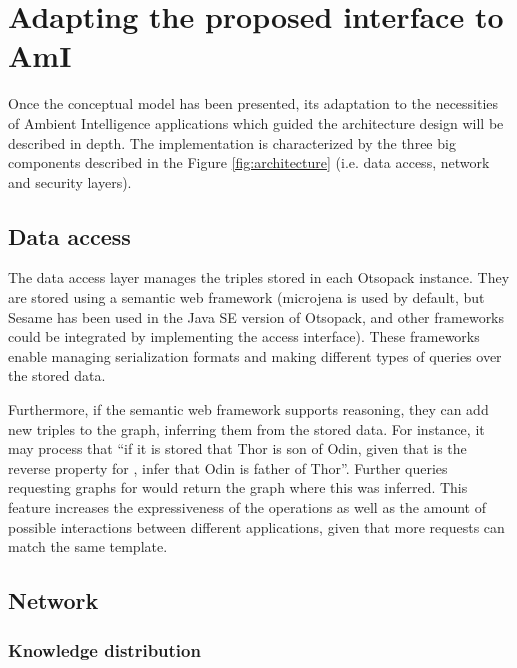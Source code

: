 
\section{Adapting the proposed interface to AmI}

Once the conceptual model has been presented, its adaptation to the necessities of Ambient Intelligence applications
which guided the architecture design will be described in depth. The implementation is characterized by the three big
components described in the Figure \ref{fig:architecture} (i.e. data access, network and security layers).


\subsection{Data access}

The data access layer manages the triples stored in each Otsopack instance. They are stored using a semantic web
framework (microjena is used by default, but Sesame has been used in the Java SE version of Otsopack, and other
frameworks could be integrated by implementing the access interface). These frameworks enable managing serialization
formats and making different types of queries over the stored data.

Furthermore, if the semantic web framework supports reasoning, they can add new triples to the graph, inferring them
from the stored data. For instance, it may process that ``if it is stored that Thor is son of Odin, given that
 is the reverse property for , infer that Odin is father of Thor''. Further queries
requesting graphs for  would return the graph where this was inferred. This feature increases
the expressiveness of the operations as well as the amount of possible interactions between different applications,
given that more requests can match the same template.

\subsection{Network}

\subsubsection{Knowledge distribution}

